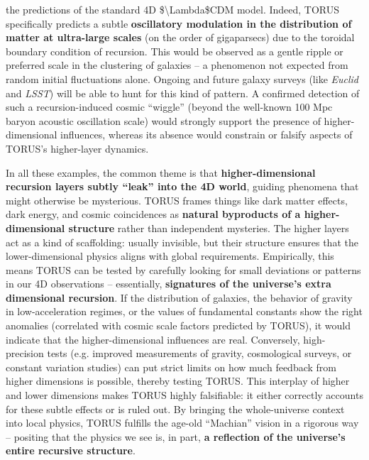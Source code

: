 \documentclass[
]{article}
\begin{document}
{\begin{itemize}
  the predictions of the standard 4D \$\textbackslash Lambda\$CDM model.
  Indeed, TORUS specifically predicts a subtle \textbf{oscillatory
  modulation in the distribution of matter at ultra-large scales} (on
  the order of gigaparsecs) due to the toroidal boundary condition of
  recursion\hspace{0pt}. This would be observed as a gentle ripple or
  preferred scale in the clustering of galaxies -- a phenomenon not
  expected from random initial fluctuations alone. Ongoing and future
  galaxy surveys (like \emph{Euclid} and \emph{LSST}) will be able to
  hunt for this kind of pattern\hspace{0pt}. A confirmed detection of
  such a recursion-induced cosmic ``wiggle'' (beyond the well-known 100
  Mpc baryon acoustic oscillation scale) would strongly support the
  presence of higher-dimensional influences, whereas its absence would
  constrain or falsify aspects of TORUS's higher-layer dynamics.
\end{itemize}

In all these examples, the common theme is that
\textbf{higher-dimensional recursion layers subtly ``leak'' into the 4D
world}, guiding phenomena that might otherwise be mysterious. TORUS
frames things like dark matter effects, dark energy, and cosmic
coincidences as \textbf{natural byproducts of a higher-dimensional
structure} rather than independent mysteries. The higher layers act as a
kind of scaffolding: usually invisible, but their structure ensures that
the lower-dimensional physics aligns with global requirements.
Empirically, this means TORUS can be tested by carefully looking for
small deviations or patterns in our 4D observations -- essentially,
\textbf{signatures of the universe's extra dimensional recursion}. If
the distribution of galaxies, the behavior of gravity in
low-acceleration regimes, or the values of fundamental constants show
the right anomalies (correlated with cosmic scale factors predicted by
TORUS), it would indicate that the higher-dimensional influences are
real. Conversely, high-precision tests (e.g. improved measurements of
gravity, cosmological surveys, or constant variation studies) can put
strict limits on how much feedback from higher dimensions is possible,
thereby testing TORUS. This interplay of higher and lower dimensions
makes TORUS highly falsifiable: it either correctly accounts for these
subtle effects or is ruled out. By bringing the whole-universe context
into local physics, TORUS fulfills the age-old ``Machian'' vision in a
rigorous way -- positing that the physics we see is, in part, \textbf{a
reflection of the universe's entire recursive structure}.

}
\end{document}
